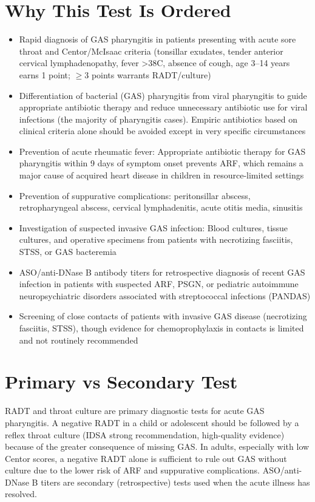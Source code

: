 \section*{Why This Test Is Ordered}
\begin{itemize}
  \item Rapid diagnosis of GAS pharyngitis in patients presenting with acute sore throat and Centor/McIsaac criteria (tonsillar exudates, tender anterior cervical lymphadenopathy, fever >38\textdegree{}C, absence of cough, age 3--14 years earns 1 point; $\geq$3 points warrants RADT/culture)
  \item Differentiation of bacterial (GAS) pharyngitis from viral pharyngitis to guide appropriate antibiotic therapy and reduce unnecessary antibiotic use for viral infections (the majority of pharyngitis cases). Empiric antibiotics based on clinical criteria alone should be avoided except in very specific circumstances
  \item Prevention of acute rheumatic fever: Appropriate antibiotic therapy for GAS pharyngitis within 9 days of symptom onset prevents ARF, which remains a major cause of acquired heart disease in children in resource-limited settings
  \item Prevention of suppurative complications: peritonsillar abscess, retropharyngeal abscess, cervical lymphadenitis, acute otitis media, sinusitis
  \item Investigation of suspected invasive GAS infection: Blood cultures, tissue cultures, and operative specimens from patients with necrotizing fasciitis, STSS, or GAS bacteremia
  \item ASO/anti-DNase B antibody titers for retrospective diagnosis of recent GAS infection in patients with suspected ARF, PSGN, or pediatric autoimmune neuropsychiatric disorders associated with streptococcal infections (PANDAS)
  \item Screening of close contacts of patients with invasive GAS disease (necrotizing fasciitis, STSS), though evidence for chemoprophylaxis in contacts is limited and not routinely recommended
\end{itemize}

\section*{Primary vs Secondary Test}
RADT and throat culture are primary diagnostic tests for acute GAS pharyngitis. A negative RADT in a child or adolescent should be followed by a reflex throat culture (IDSA strong recommendation, high-quality evidence) because of the greater consequence of missing GAS. In adults, especially with low Centor scores, a negative RADT alone is sufficient to rule out GAS without culture due to the lower risk of ARF and suppurative complications. ASO/anti-DNase B titers are secondary (retrospective) tests used when the acute illness has resolved.

